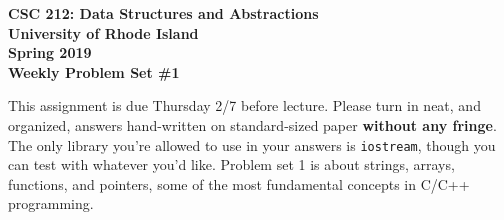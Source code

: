 \documentclass[11pt]{article}
\begin{document}
\thispagestyle{empty}

\begin{center}
    {\Large\bf CSC 212: Data Structures and Abstractions}\\
    \medskip
    {\Large\bf University of Rhode Island}\\
    \bigskip
    {\Large\bf Spring 2019}\\
    \bigskip
    {\Large\bf Weekly Problem Set \#1}
\end{center}

\vspace{25pt}

This assignment is due Thursday 2/7 before lecture.  Please turn in neat, and organized, answers hand-written on standard-sized paper {\bf without any fringe}. The only library you're allowed to use in your answers is \verb|iostream|, though you can test with whatever you'd like. Problem set 1 is about strings, arrays, functions, and pointers, some of the most fundamental concepts in C/C++ programming.
\end{document}
